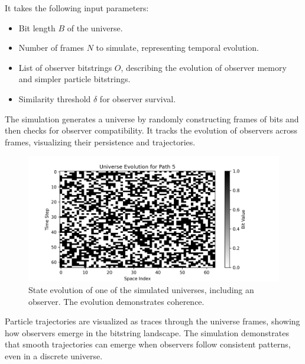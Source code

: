 \documentclass[12pt]{article}
\begin{document}
It takes the following input parameters:

\begin{itemize}
      \item Bit length $B$ of the universe.
      \item Number of frames $N$ to simulate, representing temporal evolution.
      \item List of observer bitstrings $O$, describing the evolution of observer memory and simpler particle bitstrings.
      \item Similarity threshold $\delta$ for observer survival.
\end{itemize}

The simulation generates a universe by randomly constructing frames of bits and then checks for observer compatibility. It tracks the evolution of observers across frames, visualizing their persistence and trajectories.

\begin{figure}[h!]
      \centering
      \includegraphics[width=1.0\textwidth]{figures/state_evolution_heatmap.png}
      \caption{State evolution of one of the simulated universes, including an observer. The evolution demonstrates coherence.}
      \label{fig:state_evolution}
\end{figure}

Particle trajectories are visualized as traces through the universe frames, showing how observers emerge in the bitstring landscape. The simulation demonstrates that smooth trajectories can emerge when observers follow consistent patterns, even in a discrete universe.
\end{document}
